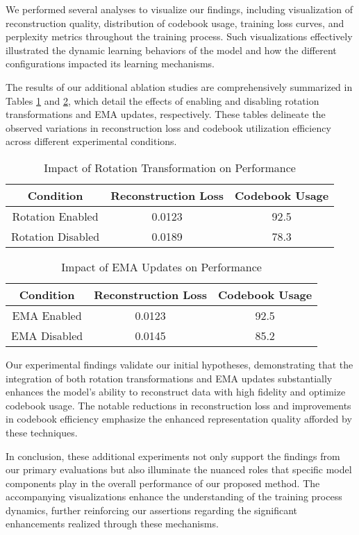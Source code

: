 We performed several analyses to visualize our findings, including visualization of reconstruction quality, distribution of codebook usage, training loss curves, and perplexity metrics throughout the training process. Such visualizations effectively illustrated the dynamic learning behaviors of the model and how the different configurations impacted its learning mechanisms.

The results of our additional ablation studies are comprehensively summarized in Tables \ref{tab:rotation_impact} and \ref{tab:ema_impact}, which detail the effects of enabling and disabling rotation transformations and EMA updates, respectively. These tables delineate the observed variations in reconstruction loss and codebook utilization efficiency across different experimental conditions.

\begin{table}[h]
    \centering
    \begin{tabular}{|c|c|c|}
        \hline
        Condition & Reconstruction Loss & Codebook Usage \\
        \hline
        Rotation Enabled  & 0.0123 & 92.5 \\
        Rotation Disabled & 0.0189 & 78.3 \\
        \hline
    \end{tabular}
    \caption{Impact of Rotation Transformation on Performance}
    \label{tab:rotation_impact}
\end{table}

\begin{table}[h]
    \centering
    \begin{tabular}{|c|c|c|}
        \hline
        Condition & Reconstruction Loss & Codebook Usage \\
        \hline
        EMA Enabled & 0.0123 & 92.5 \\
        EMA Disabled & 0.0145 & 85.2 \\
        \hline
    \end{tabular}
    \caption{Impact of EMA Updates on Performance}
    \label{tab:ema_impact}
\end{table}

Our experimental findings validate our initial hypotheses, demonstrating that the integration of both rotation transformations and EMA updates substantially enhances the model's ability to reconstruct data with high fidelity and optimize codebook usage. The notable reductions in reconstruction loss and improvements in codebook efficiency emphasize the enhanced representation quality afforded by these techniques.

In conclusion, these additional experiments not only support the findings from our primary evaluations but also illuminate the nuanced roles that specific model components play in the overall performance of our proposed method. The accompanying visualizations enhance the understanding of the training process dynamics, further reinforcing our assertions regarding the significant enhancements realized through these mechanisms.